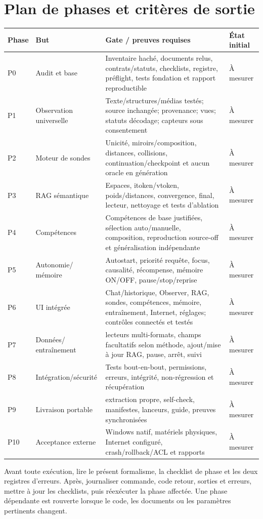 \documentclass[11pt,a4paper]{report}
\begin{document}
\chapter{Plan de phases et critères de sortie}
\small
\begin{longtable}{>{\raggedright\arraybackslash}p{.07\linewidth}>{\raggedright\arraybackslash}p{.18\linewidth}>{\raggedright\arraybackslash}p{.58\linewidth}>{\raggedright\arraybackslash}p{.05\linewidth}}\toprule Phase & But & Gate / preuves requises & État initial \\
\midrule
P0 & Audit et base & Inventaire haché, documents relus, contrats/statuts, checklists, registre, préflight, tests fondation et rapport reproductible & À mesurer \\
P1 & Observation universelle & Texte/structures/médias testés; source inchangée; provenance; vues; statuts décodage; capteurs sous consentement & À mesurer \\
P2 & Moteur de sondes & Unicité, miroirs/composition, distances, collisions, continuation/checkpoint et aucun oracle en génération & À mesurer \\
P3 & RAG sémantique & Espaces, itoken/vtoken, poids/distances, convergence, final, lecteur, nettoyage et tests d'ablation & À mesurer \\
P4 & Compétences & Compétences de base justifiées, sélection auto/manuelle, composition, reproduction source-off et généralisation indépendante & À mesurer \\
P5 & \shortstack[l]{Autonomie/\\mémoire} & Autostart, priorité requête, focus, causalité, récompense, mémoire ON/OFF, pause/stop/reprise & À mesurer \\
P6 & UI intégrée & Chat/historique, Observer, RAG, sondes, compétences, mémoire, entraînement, Internet, réglages; contrôles connectés et testés & À mesurer \\
P7 & \shortstack[l]{Données/\\entraînement} & lecteurs multi-formats, champs facultatifs selon méthode, ajout/mise à jour RAG, pause, arrêt, suivi & À mesurer \\
P8 & Intégration/sécurité & Tests bout-en-bout, permissions, erreurs, intégrité, non-régression et récupération & À mesurer \\
P9 & Livraison portable & extraction propre, self-check, manifestes, lanceurs, guide, preuves synchronisées & À mesurer \\
P10 & Acceptance externe & Windows natif, matériels physiques, Internet configuré, crash/rollback/ACL et rapports & À mesurer \\
\bottomrule\end{longtable}\normalsize
Avant toute exécution, lire le présent formalisme, la checklist de phase et les deux registres d'erreurs. Après, journaliser commande, code retour, sorties et erreurs, mettre à jour les checklists, puis réexécuter la phase affectée. Une phase dépendante est rouverte lorsque le code, les documents ou les paramètres pertinents changent.
\end{document}
